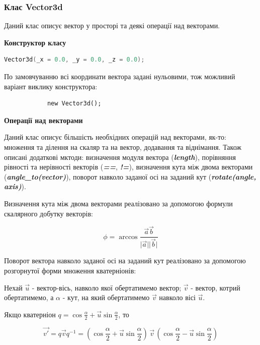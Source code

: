 \documentclass[simple,a4paper,14pt,ukrainian,utf8]{eskdtext}
\newcommand{\abs}[1]{\lvert#1\rvert} %
\begin{document}
    	\subsubsection{Клас Vector3d}

            Даний клас описує вектор у просторі та деякі операції над векторами.

            \textbf{Конструктор класу}

            \begin{lstlisting}[language=C++]
            Vector3d(_x = 0.0, _y = 0.0, _z = 0.0);
            \end{lstlisting}

            По замовчуванню всі координати вектора задані нульовими, тож можливий варіант виклику конструктора:

            \begin{lstlisting}
            new Vector3d(); 
            \end{lstlisting}

            \textbf{Операції над векторами}

            Даний клас описує більшість необхідних операцій над векторами, як-то: множення та ділення на скаляр та на вектор, додавання та віднімання. Також описані додаткові мктоди: визначення модуля вектора (\textit{\textbf{length}}), порівняння рівності та нерівності векторів (\textit{\textbf{==}}, \textit{\textbf{!=}}), визначення кута між двома векторами (\textit{\textbf{angle\_to(vector)}}), поворот навколо заданої осі на заданий кут (\textit{\textbf{rotate(angle, axis)}}).

            Визначення кута між двома векторами реалізовано за допомогою формули скалярного добутку векторів:

            $$ \phi = \arccos \frac{\vec{a}\vec{b}}{\abs{\vec{a}}\abs{\vec{b}}} $$

            Поворот вектора навколо заданої осі на заданий кут реалізовано за допомогою розгорнутої форми множення кватерніонів:


            Нехай $\vec{u}$ - вектор-вісь, навколо якої обертатимемо вектор; $\vec{v}$ - вектор, котрий обертатимемо, а $\alpha$ - кут, на який обертатимемо $\vec{v}$ навколо вісі $\vec{u}$.

            Якщо кватерніон $ q = \cos \frac{\alpha}{2} + \vec{u} \sin \frac{\alpha}{2} $, то

            $$ \vec{v'} = q \vec{v} q^{-1} = \left( \cos \frac{\alpha}{2} + \vec{u} \sin \frac{\alpha}{2} \right) \, \vec{v} \, \left( \cos \frac{\alpha}{2} - \vec{u} \sin \frac{\alpha}{2} \right) $$
\end{document}
